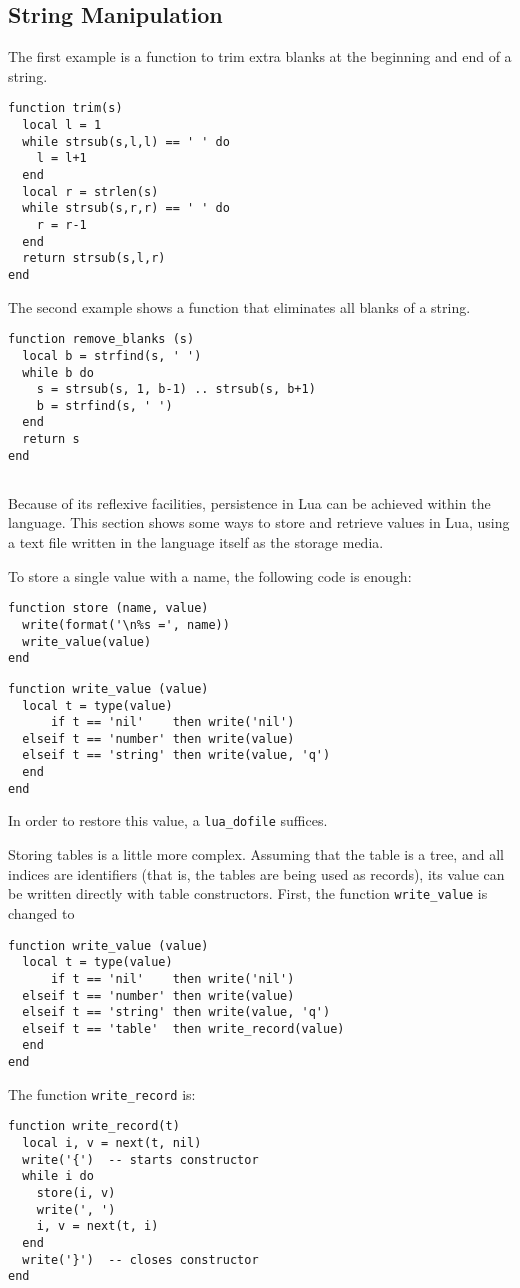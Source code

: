 \subsection{String Manipulation} \label{exstring}

The first example is a function to trim extra blanks at the beginning
and end of a string.
\begin{verbatim}
function trim(s)
  local l = 1
  while strsub(s,l,l) == ' ' do
    l = l+1
  end
  local r = strlen(s)
  while strsub(s,r,r) == ' ' do
    r = r-1
  end
  return strsub(s,l,r)
end
\end{verbatim}

The second example shows a function that eliminates all blanks
of a string.
\begin{verbatim}
function remove_blanks (s)
  local b = strfind(s, ' ')
  while b do
    s = strsub(s, 1, b-1) .. strsub(s, b+1)
    b = strfind(s, ' ')
  end
  return s
end
\end{verbatim}


\subsection{}
Because of its reflexive facilities,
persistence in Lua can be achieved within the language.
This section shows some ways to store and retrieve values in Lua,
using a text file written in the language itself as the storage media.

To store a single value with a name,
the following code is enough:
\begin{verbatim}
function store (name, value)
  write(format('\n%s =', name))
  write_value(value)
end
\end{verbatim}
\begin{verbatim}
function write_value (value)
  local t = type(value)
      if t == 'nil'    then write('nil')
  elseif t == 'number' then write(value)
  elseif t == 'string' then write(value, 'q')
  end
end
\end{verbatim}
In order to restore this value, a \verb'lua_dofile' suffices.

Storing tables is a little more complex.
Assuming that the table is a tree,
and all indices are identifiers
(that is, the tables are being used as records),
its value can be written directly with table constructors.
First, the function \verb'write_value' is changed to
\begin{verbatim}
function write_value (value)
  local t = type(value)
      if t == 'nil'    then write('nil')
  elseif t == 'number' then write(value)
  elseif t == 'string' then write(value, 'q')
  elseif t == 'table'  then write_record(value)
  end
end
\end{verbatim}
The function \verb'write_record' is:
\begin{verbatim}
function write_record(t)
  local i, v = next(t, nil)
  write('{')  -- starts constructor
  while i do
    store(i, v)
    write(', ')
    i, v = next(t, i)
  end
  write('}')  -- closes constructor
end
\end{verbatim}


